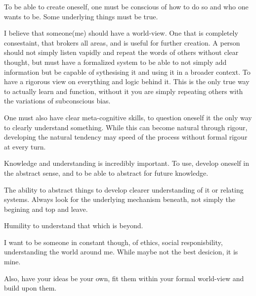 To be able to create oneself, one must be conscious of how to do so and who one wants to be. Some underlying things must be true.

I believe that someone(me) should have a world-view. One that is completely consestaint, that brokers all areas, and is useful for further creation.
A person should not simply listen vapidly and repeat the words of others without clear thought, but must have a formalized system to be able to not
simply add information but be capable of sythesising it and using it in a broader context. To have a rigorous view on everything and logic behind it.
This is the only true way to actually learn and function, without it you are simply repeating others with the variations of subconscious bias.

One must also have clear meta-cognitive skills, to question oneself it the only way to clearly understand something. While this can become natural
through rigour, developing the natural tendency may speed of the process without formal rigour at every turn.

Knowledge and understanding is incredibly important. To use, develop oneself in the abstract sense, and to be able to abstract for future knowledge.

The ability to abstract things to develop clearer understanding of it or relating systems. Always look for the underlying mechanism beneath, not
simply the begining and top and leave.

Humility to understand that which is beyond.

I want to be someone in constant though, of ethics, social responisbility, understanding the world around me. While maybe not the best desicion, it is mine.

Also, have your ideas be your own, fit them within your formal world-view and build upon them.
